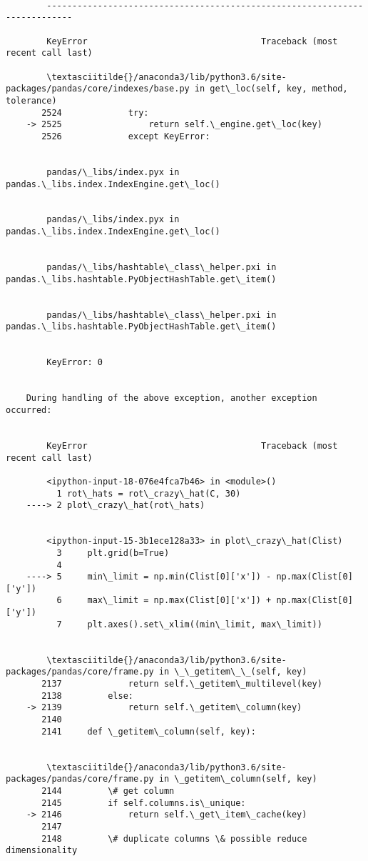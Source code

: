 \documentclass[11pt]{article}
\begin{document}
    \begin{Verbatim}[commandchars=\\\{\}]

        ---------------------------------------------------------------------------

        KeyError                                  Traceback (most recent call last)

        \textasciitilde{}/anaconda3/lib/python3.6/site-packages/pandas/core/indexes/base.py in get\_loc(self, key, method, tolerance)
       2524             try:
    -> 2525                 return self.\_engine.get\_loc(key)
       2526             except KeyError:


        pandas/\_libs/index.pyx in pandas.\_libs.index.IndexEngine.get\_loc()


        pandas/\_libs/index.pyx in pandas.\_libs.index.IndexEngine.get\_loc()


        pandas/\_libs/hashtable\_class\_helper.pxi in pandas.\_libs.hashtable.PyObjectHashTable.get\_item()


        pandas/\_libs/hashtable\_class\_helper.pxi in pandas.\_libs.hashtable.PyObjectHashTable.get\_item()


        KeyError: 0

        
    During handling of the above exception, another exception occurred:


        KeyError                                  Traceback (most recent call last)

        <ipython-input-18-076e4fca7b46> in <module>()
          1 rot\_hats = rot\_crazy\_hat(C, 30)
    ----> 2 plot\_crazy\_hat(rot\_hats)
    

        <ipython-input-15-3b1ece128a33> in plot\_crazy\_hat(Clist)
          3     plt.grid(b=True)
          4 
    ----> 5     min\_limit = np.min(Clist[0]['x']) - np.max(Clist[0]['y'])
          6     max\_limit = np.max(Clist[0]['x']) + np.max(Clist[0]['y'])
          7     plt.axes().set\_xlim((min\_limit, max\_limit))


        \textasciitilde{}/anaconda3/lib/python3.6/site-packages/pandas/core/frame.py in \_\_getitem\_\_(self, key)
       2137             return self.\_getitem\_multilevel(key)
       2138         else:
    -> 2139             return self.\_getitem\_column(key)
       2140 
       2141     def \_getitem\_column(self, key):


        \textasciitilde{}/anaconda3/lib/python3.6/site-packages/pandas/core/frame.py in \_getitem\_column(self, key)
       2144         \# get column
       2145         if self.columns.is\_unique:
    -> 2146             return self.\_get\_item\_cache(key)
       2147 
       2148         \# duplicate columns \& possible reduce dimensionality



\end{Verbatim}
\end{document}
